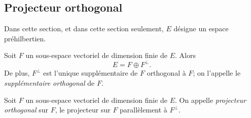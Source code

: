 \documentclass{magnolia}
\begin{document}

\subsection{Projecteur orthogonal}

Dans cette section, et dans cette section seulement, $E$ désigne un espace préhilbertien.\\

\begin{definition}
Soit $F$ un sous-espace vectoriel de dimension finie de $E$. Alors
\[E=F\oplus F^\perp.\]
De plus, $F^\perp$ est l'unique supplémentaire de $F$ orthogonal à $F$; on l'appelle le \emph{supplémentaire orthogonal}
de $F$.
\end{definition}


\begin{definition}[utile=-3]
Soit $F$ un sous-espace vectoriel de dimension finie de $E$. On appelle \emph{projecteur orthogonal} sur
$F$, le projecteur sur $F$ parallèlement à $F^\perp$.
\end{definition}
\end{document}
